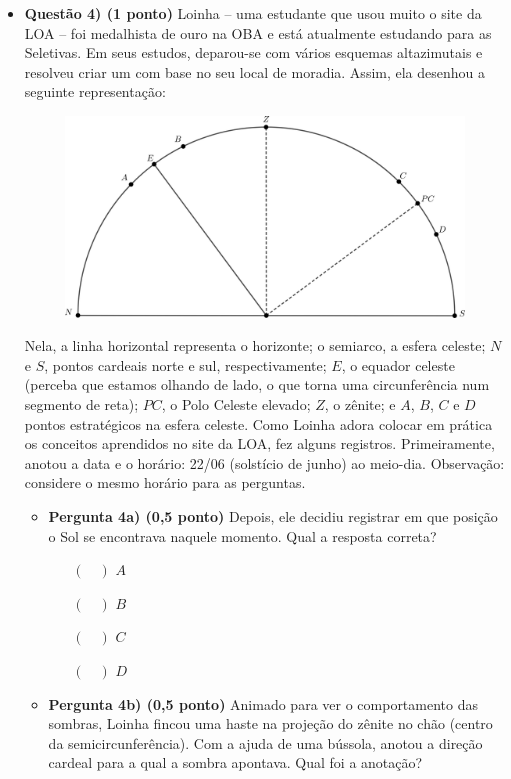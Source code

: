 \documentclass[a4paper, 12pt]{article}
\begin{document}
\begin{flushleft}
\begin{itemize}
		\item \textbf{Questão 4) (1 ponto)} Loinha -- uma estudante que usou muito o site da LOA -- foi medalhista de ouro na OBA e está atualmente estudando para as Seletivas. Em seus estudos, deparou-se com vários esquemas altazimutais e resolveu criar um com base no seu local de moradia. Assim, ela desenhou a seguinte representação:
			\begin{figure}[H]
				\centering
				\includegraphics[scale=1.2]{./img/4.png}
			\end{figure}
			Nela, a linha horizontal representa o horizonte; o semiarco, a esfera celeste; $N$ e $S$, pontos cardeais norte e sul, respectivamente; $E$, o equador celeste (perceba que estamos olhando de lado, o que torna uma circunferência num segmento de reta); $PC$, o Polo Celeste elevado; $Z$, o zênite; e $A$, $B$, $C$ e $D$ pontos estratégicos na esfera celeste. \linebreak
			Como Loinha adora colocar em prática os conceitos aprendidos no site da LOA, fez alguns registros. Primeiramente, anotou a data e o horário: 22/06 (solstício de junho) ao meio-dia.\linebreak
			Observação: considere o mesmo horário para as perguntas.
			\begin{itemize}
				\item \textbf{Pergunta 4a) (0,5 ponto)} Depois, ele decidiu registrar em que posição o Sol se encontrava naquele momento. Qual a resposta correta?
					\begin{itemize}
						\item[$(\quad)$] $A$
						\item[$(\quad)$] $B$
						\item[$(\quad)$] $C$
						\item[$(\quad)$] $D$
					\end{itemize}
				\item \textbf{Pergunta 4b) (0,5 ponto)} Animado para ver o comportamento das sombras, Loinha fincou uma haste na projeção do zênite no chão (centro da semicircunferência). Com a ajuda de uma bússola, anotou a direção cardeal para a qual a sombra apontava. Qual foi a anotação?

\end{itemize}
\end{itemize}
\end{flushleft}
\end{document}
